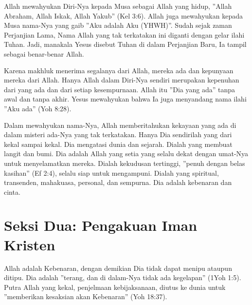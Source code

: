 \newpage
{}
\setcounter{kgkcounter}{37}
\normalsize
{}
Allah mewahyukan Diri-Nya kepada Musa sebagai Allah yang hidup, ”Allah
Abraham, Allah Iskak, Allah Yakub” (Kel 3:6). Allah juga mewahyukan kepada Musa
nama-Nya yang gaib ”Aku adalah Aku (YHWH)”. Sudah sejak zaman Perjanjian
Lama, Nama Allah yang tak terkatakan ini diganti dengan gelar ilahi Tuhan. Jadi, manakala Yesus disebut Tuhan di dalam Perjanjian Baru, Ia tampil sebagai benar-benar Allah.

Karena makhluk menerima segalanya dari Allah, mereka ada dan kepunyaan
mereka dari Allah. Hanya Allah dalam Diri-Nya sendiri merupakan kepenuhan dari
yang ada dan dari setiap kesempurnaan. Allah itu ”Dia yang ada” tanpa awal dan
tanpa akhir. Yesus mewahyukan bahwa Ia juga menyandang nama ilahi ”Aku ada”
 (Yoh 8:28).

\small

Dalam mewahyukan nama-Nya, Allah memberitahukan kekayaan yang
 ada di dalam misteri ada-Nya yang tak terkatakan. Hanya Dia sendirilah yang
 dari kekal sampai kekal. Dia mengatasi dunia dan sejarah. Dialah yang membuat
 langit dan bumi. Dia adalah Allah yang setia yang selalu dekat dengan umat-Nya
 untuk menyelamatkan mereka. Dialah kekudusan tertinggi, ”penuh dengan belas
 kasihan” (Ef 2:4), selalu siap untuk mengampuni. Dialah yang spiritual, transenden,
 mahakuasa, personal, dan sempurna. Dia adalah kebenaran dan cinta.

\section*{Seksi Dua: Pengakuan Iman Kristen}

 Allah adalah Kebenaran, dengan demikian Dia tidak dapat menipu ataupun 
ditipu. Dia adalah ”terang, dan di dalam-Nya tidak ada kegelapan” (1Yoh 1:5). Putra 
Allah yang kekal, penjelmaan kebijaksanaan, diutus ke dunia untuk ”memberikan
kesaksian akan Kebenaran” (Yoh 18:37).

\normalsize